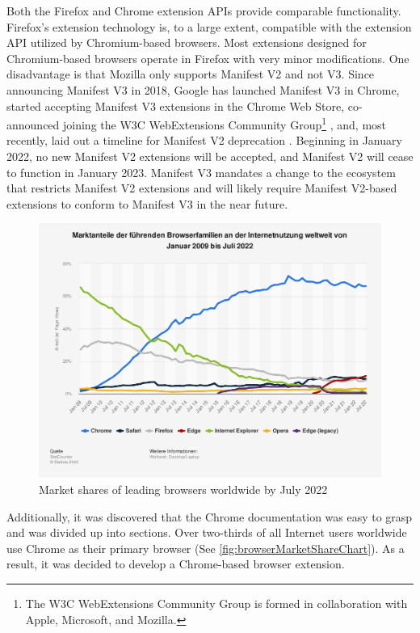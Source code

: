 Both the Firefox and Chrome extension APIs provide comparable functionality. Firefox's extension technology is, to a large extent, compatible with the extension API utilized by Chromium-based browsers. Most extensions designed for Chromium-based browsers operate in Firefox with very minor modifications. One disadvantage is that Mozilla only supports Manifest V2 and not V3. Since announcing Manifest V3 in 2018, Google has launched Manifest V3 in Chrome, started accepting Manifest V3 extensions in the Chrome Web Store, co-announced joining the W3C WebExtensions Community Group\footnote{The W3C WebExtensions Community Group is formed in collaboration with Apple, Microsoft, and Mozilla.} , and, most recently, laid out a timeline for Manifest V2 deprecation \autocite{alexei2021manifest}. Beginning in January 2022, no new Manifest V2 extensions will be accepted, and Manifest V2 will cease to function in January 2023. Manifest V3 mandates a change to the ecosystem that restricts Manifest V2 extensions and will likely require Manifest V2-based extensions to conform to Manifest V3 in the near future.

\begin{figure}[H]
  \includegraphics[width=\textwidth]{assets/statistic_id157944_marktanteile-fuehrender-browser-weltweit-bis-juli-2022.png}
  \caption{Market shares of leading browsers worldwide by July 2022}
  \label{fig:browserMarketShareChart}
\end{figure}

Additionally, it was discovered that the Chrome documentation was easy to grasp and was divided up into sections. Over two-thirds of all Internet users worldwide use Chrome as their primary browser (See \autoref{fig:browserMarketShareChart}). As a result, it was decided to develop a Chrome-based browser extension.


